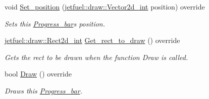 \begin{DoxyCompactItemize}
void \hyperlink{classjetfuel_1_1gui_1_1Progress__bar_a5f52369cccd805274805abf5913535df}{Set\+\_\+position} (\hyperlink{classjetfuel_1_1draw_1_1Vector2d}{jetfuel\+::draw\+::\+Vector2d\+\_\+int} position) override
\begin{DoxyCompactList}\small\item\em Sets this \hyperlink{classjetfuel_1_1gui_1_1Progress__bar}{Progress\+\_\+bar}\textquotesingle{}s position. \end{DoxyCompactList}\item 
\hyperlink{classjetfuel_1_1draw_1_1Rect2d}{jetfuel\+::draw\+::\+Rect2d\+\_\+int} \hyperlink{classjetfuel_1_1gui_1_1Progress__bar_a4a09c3d515c9754b8295a4b5d83291ff}{Get\+\_\+rect\+\_\+to\+\_\+draw} () override
\begin{DoxyCompactList}\small\item\em Gets the rect to be drawn when the function Draw is called. \end{DoxyCompactList}\item 
bool \hyperlink{classjetfuel_1_1gui_1_1Progress__bar_a91a7ffe82738105be9b36a48dca1cdec}{Draw} () override
\begin{DoxyCompactList}\small\item\em Draws this \hyperlink{classjetfuel_1_1gui_1_1Progress__bar}{Progress\+\_\+bar}. \end{DoxyCompactList}\end{DoxyCompactItemize}
